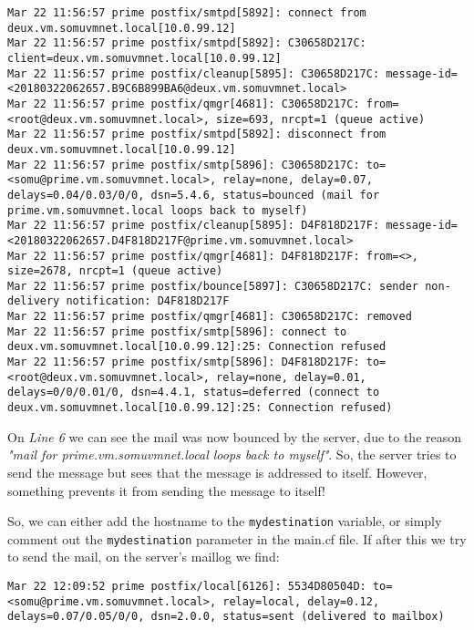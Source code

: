 \vspace{-15pt}
\begin{verbatim}
Mar 22 11:56:57 prime postfix/smtpd[5892]: connect from deux.vm.somuvmnet.local[10.0.99.12]
Mar 22 11:56:57 prime postfix/smtpd[5892]: C30658D217C: client=deux.vm.somuvmnet.local[10.0.99.12]
Mar 22 11:56:57 prime postfix/cleanup[5895]: C30658D217C: message-id=<20180322062657.B9C6B899BA6@deux.vm.somuvmnet.local>
Mar 22 11:56:57 prime postfix/qmgr[4681]: C30658D217C: from=<root@deux.vm.somuvmnet.local>, size=693, nrcpt=1 (queue active)
Mar 22 11:56:57 prime postfix/smtpd[5892]: disconnect from deux.vm.somuvmnet.local[10.0.99.12]
Mar 22 11:56:57 prime postfix/smtp[5896]: C30658D217C: to=<somu@prime.vm.somuvmnet.local>, relay=none, delay=0.07, delays=0.04/0.03/0/0, dsn=5.4.6, status=bounced (mail for prime.vm.somuvmnet.local loops back to myself)
Mar 22 11:56:57 prime postfix/cleanup[5895]: D4F818D217F: message-id=<20180322062657.D4F818D217F@prime.vm.somuvmnet.local>
Mar 22 11:56:57 prime postfix/qmgr[4681]: D4F818D217F: from=<>, size=2678, nrcpt=1 (queue active)
Mar 22 11:56:57 prime postfix/bounce[5897]: C30658D217C: sender non-delivery notification: D4F818D217F
Mar 22 11:56:57 prime postfix/qmgr[4681]: C30658D217C: removed
Mar 22 11:56:57 prime postfix/smtp[5896]: connect to deux.vm.somuvmnet.local[10.0.99.12]:25: Connection refused
Mar 22 11:56:57 prime postfix/smtp[5896]: D4F818D217F: to=<root@deux.vm.somuvmnet.local>, relay=none, delay=0.01, delays=0/0/0.01/0, dsn=4.4.1, status=deferred (connect to deux.vm.somuvmnet.local[10.0.99.12]:25: Connection refused)
\end{verbatim}
\vspace{-10pt}	

\noindent
On \textit{Line 6} we can see the mail was now bounced by the server, due to the reason \textit{"mail for prime.vm.somuvmnet.local loops back to myself"}. So, the server tries to send the message but sees that the message is addressed to itself. However, something prevents it from sending the message to itself! 

So, we can either add the hostname to the \verb|mydestination| variable, or simply comment out the \verb|mydestination| parameter in the main.cf file. If after this we try to send the mail, on the server's maillog we find:

\vspace{-15pt}
\begin{verbatim}
Mar 22 12:09:52 prime postfix/local[6126]: 5534D80504D: to=<somu@prime.vm.somuvmnet.local>, relay=local, delay=0.12, delays=0.07/0.05/0/0, dsn=2.0.0, status=sent (delivered to mailbox)
\end{verbatim}
\vspace{-10pt}	

